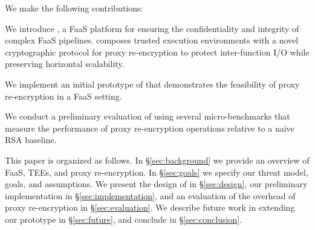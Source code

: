 


%
We make the following contributions:
%
\begin{widelist}
\item We introduce \SystemName, a FaaS platform for ensuring the
    confidentiality and integrity of complex FaaS pipelines.
    \SystemName composes trusted execution environments with a novel
    cryptographic protocol for proxy re-encryption to protect inter-function
    I/O while preserving horizontal scalability.

\item We implement an initial prototype of \SystemName that demonstrates the
    feasibility of proxy re-encryption in a FaaS setting.

\item We conduct a preliminary evaluation of \SystemName using several
    micro-benchmarks that measure the performance of proxy re-encryption 
    operations relative to a na\"{i}ve RSA baseline.
\end{widelist}


%
This paper is organized as follows.
%
In \S\ref{sec:background} we provide an overview of FaaS, TEEs, and proxy
re-encryption.
%
In \S\ref{sec:goals} we specify our threat model, goals, and assumptions.
%
We present the design of \SystemName in \S\ref{sec:design}, our preliminary
implementation in \S\ref{sec:implementation}, and an evaluation of the overhead
of proxy re-encryption in \S\ref{sec:evaluation}.
%
We describe future work in extending our prototype in \S\ref{sec:future}, and
conclude in \S\ref{sec:conclusion}.
